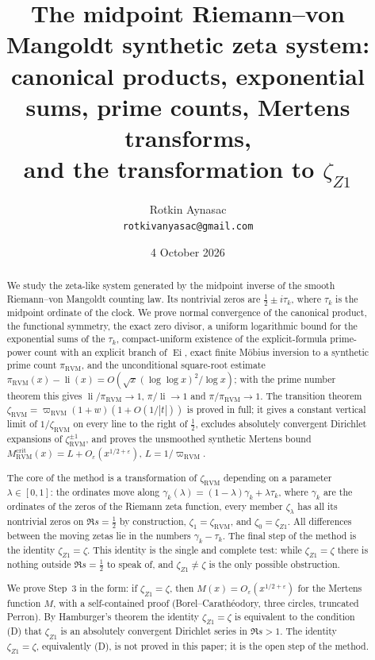\documentclass[11pt,reqno]{amsart}
\numberwithin{equation}{section}
\theoremstyle{plain}
\theoremstyle{definition}
\theoremstyle{remark}
\newcommand{\eps}{\varepsilon}
\newcommand{\li}{\operatorname{li}}
\newcommand{\Ei}{\operatorname{Ei}}
\newcommand{\RVM}{\mathrm{RVM}}
\newcommand{\crit}{\mathrm{crit}}
\providecommand{\NoCaseChange}[1]{\lowercase{#1}}
\begin{document}
\title[The midpoint RVM synthetic zeta system]{The midpoint Riemann--von Mangoldt synthetic zeta system:\\
canonical products, exponential sums, prime counts, Mertens transforms,\\
and the transformation to $\zeta_{Z1}$}
\author{Rotkin Aynasac\\[2pt]\NoCaseChange{\normalfont\texttt{rotkivanyasac@gmail.com}}}
\date{4 October 2026}

\begin{abstract}
We study the zeta-like system generated by the midpoint inverse of the smooth Riemann--von Mangoldt counting law.  Its nontrivial zeros are $\tfrac12\pm i\tau_k$, where $\tau_k$ is the midpoint ordinate of the clock.  We prove normal convergence of the canonical product, the functional symmetry, the exact zero divisor, a uniform logarithmic bound for the exponential sums of the $\tau_k$, compact-uniform existence of the explicit-formula prime-power count with an explicit branch of $\Ei$, exact finite M\"obius inversion to a synthetic prime count $\pi_{\RVM}$, and the unconditional square-root estimate $\pi_{\RVM}(x)-\li(x)=O(\sqrt x(\log\log x)^2/\log x)$; with the prime number theorem this gives $\li/\pi_{\RVM}\to1$, $\pi/\li\to1$ and $\pi/\pi_{\RVM}\to1$.  The transition theorem $\zeta_{\RVM}=\varpi_{\RVM}(1+w)(1+O(1/|t|))$ is proved in full; it gives a constant vertical limit of $1/\zeta_{\RVM}$ on every line to the right of $\tfrac12$, excludes absolutely convergent Dirichlet expansions of $\zeta_{\RVM}^{\pm1}$, and proves the unsmoothed synthetic Mertens bound $M_{\RVM}^{\crit}(x)=L+O_\eps(x^{1/2+\eps})$, $L=1/\varpi_{\RVM}$.

The core of the method is a transformation of $\zeta_{\RVM}$ depending on a parameter $\lambda\in[0,1]$: the ordinates move along $\gamma_k(\lambda)=(1-\lambda)\gamma_k+\lambda\tau_k$, where $\gamma_k$ are the ordinates of the zeros of the Riemann zeta function, every member $\zeta_\lambda$ has all its nontrivial zeros on $\Re s=\tfrac12$ by construction, $\zeta_1=\zeta_{\RVM}$, and $\zeta_0=\zeta_{Z1}$.  All differences between the moving zetas lie in the numbers $\gamma_k-\tau_k$.  The final step of the method is the identity $\zeta_{Z1}=\zeta$.  This identity is the single and complete test: while $\zeta_{Z1}=\zeta$ there is nothing outside $\Re s=\tfrac12$ to speak of, and $\zeta_{Z1}\neq\zeta$ is the only possible obstruction.

We prove Step~3 in the form: if $\zeta_{Z1}=\zeta$, then $M(x)=O_\eps(x^{1/2+\eps})$ for the Mertens function $M$, with a self-contained proof (Borel--Carath\'eodory, three circles, truncated Perron).  By Hamburger's theorem the identity $\zeta_{Z1}=\zeta$ is equivalent to the condition (D) that $\zeta_{Z1}$ is an absolutely convergent Dirichlet series in $\Re s>1$.  The identity $\zeta_{Z1}=\zeta$, equivalently (D), is not proved in this paper; it is the open step of the method.
\end{abstract}
\end{document}

